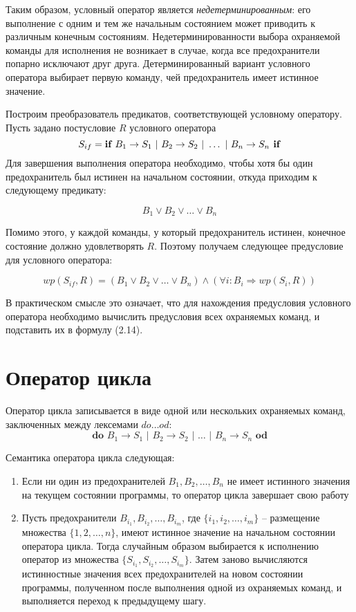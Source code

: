Таким образом, условный оператор является \textit{недетерминированным}: его выполнение с одним и тем же начальным состоянием
может приводить к различным конечным состояниям.
Недетерминированности выбора охраняемой команды для исполнения не возникает в случае, когда все предохранители попарно исключают друг друга.
Детерминированный вариант условного оператора выбирает первую команду, чей предохранитель имеет истинное значение.

Построим преобразователь предикатов, соответствующей условному оператору. Пусть задано постусловие $R$ условного 
оператора 
\begin{equation}
	S_{if} = \textbf{if } B_1 \rightarrow S_1 \text{ | } B_2 \rightarrow S_2 \text{ | } \ldots \text{ | } B_n \rightarrow S_n \textbf{ if}
\end{equation}
Для завершения выполнения оператора необходимо, чтобы хотя бы один предохранитель был истинен на начальном состоянии, откуда приходим к следующему предикату:

\begin{equation}
	B_1 \vee B_2 \vee \ldots \vee B_n
\end{equation}

Помимо этого, у каждой команды, у который предохранитель истинен, конечное состояние должно удовлетворять $R$. Поэтому
получаем следующее предусловие для условного оператора:

\begin{equation}
	wp(S_{if}, R) = (B_1 \vee B_2 \vee \ldots \vee B_n) \wedge (\forall i: B_i \Rightarrow wp(S_i, R))
\end{equation}

В практическом смысле это означает, что для нахождения предусловия условного оператора необходимо вычислить предусловия
всех охраняемых команд, и подставить их в формулу (2.14).

\section{Оператор цикла}
\newcommand{\DO}{\textbf{do } B_1 \rightarrow S_1 \text{ | } B_2 \rightarrow S_2 \text{ | } \ldots \text{ | } B_n \rightarrow S_n \textbf{ od}}
Оператор цикла записывается в виде одной или нескольких охраняемых команд, заключенных между лексемами $do\ldots od$:
\begin{equation}
	\DO
\end{equation}

Семантика оператора цикла следующая:
\begin{enumerate}
	\item Если ни один из предохранителей $B_1, B_2, \ldots, B_n$ не имеет истинного значения на текущем состоянии программы, 
	то оператор цикла завершает свою работу
	\item Пусть предохранители $B_{i_1}, B_{i_2},\ldots, B_{i_m}$, где $\{i_1, i_2, \ldots, i_m\}$ -- размещение 
	множества $\{1, 2, \ldots, n\}$, имеют истинное значение на начальном состоянии оператора цикла.
	Тогда случайным образом выбирается к исполнению оператор из множества $\{S_{i_1}, S_{i_2}, \ldots, S_{i_m}\}$.
	Затем заново вычисляются истинностные значения всех предохранителей на новом состоянии программы,
	полученном после выполнения одной из охраняемых команд, и выполняется переход к предыдущему шагу.
\end{enumerate}

